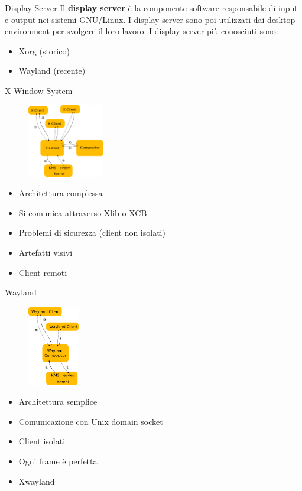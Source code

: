\begin{frame}{Display Server}
    Il \textbf{display server} è la componente software responsabile di input e output nei sistemi GNU/Linux.
    I display server sono poi utilizzati dai desktop environment per svolgere il loro lavoro.
    I display server più conosciuti sono:
    \begin{itemize}
        \item Xorg (storico)
        \item Wayland (recente)
    \end{itemize}
\end{frame}

\begin{frame}{X Window System}
    \begin{figure}[h]
        \includegraphics[width=0.3\textwidth]{images/xorg.png}
    \end{figure}
    \begin{itemize}
        \item Architettura complessa
        \item Si comunica attraverso Xlib o XCB
        \item Problemi di sicurezza (client non isolati)
        \item Artefatti visivi
        \item Client remoti
    \end{itemize}
\end{frame}
\begin{frame}{Wayland}
    \begin{figure}[h]
        \includegraphics[width=0.2\textwidth]{images/wayland.png}
    \end{figure}
    \begin{itemize}
        \item Architettura semplice
        \item Comunicazione con Unix domain socket
        \item Client isolati
        \item Ogni frame è perfetta
        \item Xwayland
    \end{itemize}
    
\end{frame}
